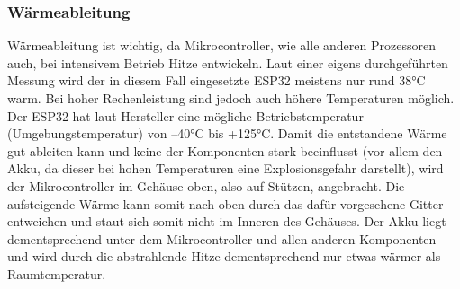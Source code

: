 \documentclass[11pt, twoside]{article}
\begin{document}
\subsubsection{Wärmeableitung}
Wärmeableitung ist wichtig, da Mikrocontroller, wie alle anderen Prozessoren auch, bei intensivem Betrieb Hitze entwickeln. Laut einer eigens durchgeführten Messung wird der in diesem Fall eingesetzte ESP32 meistens nur rund 38°C warm. Bei hoher Rechenleistung sind jedoch auch höhere Temperaturen möglich. Der ESP32 hat laut Hersteller eine mögliche Betriebstemperatur (Umgebungstemperatur) von –40°C bis +125°C. Damit die entstandene Wärme gut ableiten kann und keine der Komponenten stark beeinflusst (vor allem den Akku, da dieser bei hohen Temperaturen eine Explosionsgefahr darstellt), wird der Mikrocontroller im Gehäuse oben, also auf Stützen, angebracht. Die aufsteigende Wärme kann somit nach oben durch das dafür vorgesehene Gitter entweichen und staut sich somit nicht im Inneren des Gehäuses. Der Akku liegt dementsprechend unter dem Mikrocontroller und allen anderen Komponenten und wird durch die abstrahlende Hitze dementsprechend nur etwas wärmer als Raumtemperatur. \parencite[vgl.][]{noauthor_urlnl06_nodate}
\end{document}
